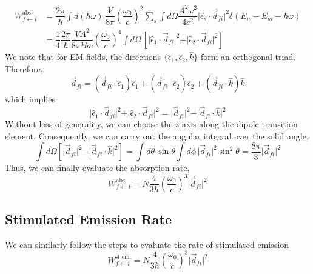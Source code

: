 \documentclass[aps,prb,onecolumn,notitlepage,showpacs,floatfix,superscriptaddress]{revtex4-1}
\newcommand{\mrm}[1]{\mathrm{#1}}
\begin{document}
\begin{equation}
\begin{split}
W^\mrm{abs}_{f \leftarrow i} &=  \dfrac{2\pi}{\hbar} \int d(\hbar\omega)\, \dfrac{V}{8\pi} \left( \dfrac{\omega_0}{c}\right)^2  \sum_s \int d\Omega \dfrac{A^2 \omega^2}{4c^2} \vert \hat{\epsilon}_s \cdot \vec{d}_{fi}\vert^2 \delta \left( E_n-E_m-\hbar\omega\right) \\
&= \dfrac{1}{4} \dfrac{2\pi}{\hbar} \dfrac{VA^2}{8\pi^3 \hbar c} \left( \dfrac{\omega_0}{c}\right)^4 \int d\Omega \, \left[ \vert \hat{\epsilon}_1 \cdot \vec{d}_{fi} \vert^2 + \vert \hat{\epsilon}_2 \cdot \vec{d}_{fi} \vert^2 \right]
\end{split}
\end{equation}
We note that for EM fields, the directions $\{\hat{\epsilon}_1, \hat{\epsilon}_2, \hat{k}\}$ form an orthogonal triad. Therefore,
\begin{equation}
\vec{d}_{fi} = (\vec{d}_{fi} \cdot \hat{\epsilon}_1) \hat{\epsilon}_1 + (\vec{d}_{fi} \cdot \hat{\epsilon}_2) \hat{\epsilon}_2 + (\vec{d}_{fi} \cdot \hat{k}) \hat{k}
\end{equation}
which implies
\begin{equation}
\vert \hat{\epsilon}_1 \cdot \vec{d}_{fi} \vert^2 + \vert \hat{\epsilon}_2 \cdot \vec{d}_{fi} \vert^2 = \vert \vec{d}_{fi} \vert^2 - \vert \vec{d}_{fi} \cdot \hat{k} \vert^2
\end{equation}
Without loss of generality, we can choose the z-axis along the dipole transition element. Consequently, we can carry out the angular integral over the solid angle,
\begin{equation}
\int d\Omega  [\vert \vec{d}_{fi} \vert^2 - \vert \vec{d}_{fi} \cdot \hat{k} \vert^2] = \int d\theta \, \sin\theta \int d\phi \, \vert \vec{d}_{fi} \vert^2 \sin^2\theta = \dfrac{8\pi}{3} \vert \vec{d}_{fi} \vert^2
\end{equation}
Thus, we can finally evaluate the absorption rate,
\begin{equation}
W^\mrm{abs}_{f \leftarrow i} = N \dfrac{4}{3\hbar} \left( \dfrac{\omega_0}{c}\right)^3 \vert \vec{d}_{fi} \vert^2
\end{equation}

\subsection{Stimulated Emission Rate}
We can similarly follow the steps to evaluate the rate of stimulated emission
\begin{equation}
W^\mrm{st. em.}_{f \leftarrow i} = N \dfrac{4}{3\hbar} \left( \dfrac{\omega_0}{c}\right)^3 \vert \vec{d}_{fi} \vert^2
\end{equation}
\end{document}
